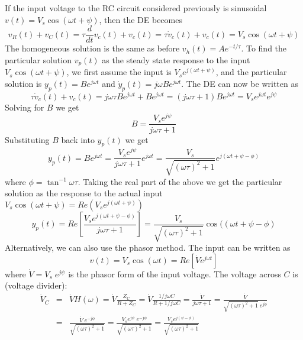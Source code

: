 \documentclass{article}
\begin{document}
If the input voltage to the RC circuit considered previously is sinusoidal 
$v(t)=V_s \cos(\omega t+\psi)$, then the DE becomes
\begin{equation}
  v_R(t)+v_C(t)=\tau\frac{d}{dt} v_c(t)+v_c(t)
  =\tau\dot{v}_c(t)+v_c(t)=V_s \cos(\omega t+\psi)	
\end{equation}
The homogeneous solution is the same as before $v_h(t)=A e^{-t/\tau}$.
To find the particular solution $v_p(t)$ as the steady state response 
to the input $V_s\cos(\omega t+\psi)$, we first assume the input is
$V_s e^{j(\omega t+\psi)}$, and the particular solution is $y_p(t)=B e^{j\omega t}$
and $\dot{y}_p(t)=j\omega B e^{j\omega t}$. The DE can now be written as
\begin{equation}
  \tau\dot{v}_c(t)+v_c(t)=j\omega\tau Be^{j\omega t}+Be^{j\omega t}
  =(j\omega\tau +1) B e^{j\omega t} =V_s e^{j\omega t} e^{j\psi}
\end{equation}
Solving for $B$ we get
\begin{equation}
  B=\frac{V_s e^{j\psi}}{j\omega\tau+1}
\end{equation}
Substituting $B$ back into $y_p(t)$ we get
\begin{equation}
  y_p(t)=B e^{j\omega t}=\frac{V_s e^{j\psi}}{j\omega\tau+1} e^{j\omega t}
  =\frac{V_s}{\sqrt{(\omega\tau)^2+1}}e^{j(\omega t+\psi-\phi)}
\end{equation}
where $\phi=\tan^{-1}\omega\tau$. Taking the real part of the above
we get the particular solution as the response to the actual input 
$V_s\cos(\omega t+\psi)=Re(V_s e^{j(\omega t+\psi)})$
\begin{equation}
  y_p(t)=Re\left[\frac{V_s e^{j(\omega t+\psi-\phi)}}{j\omega\tau+1}\right]
  =\frac{V_s}{\sqrt{(\omega\tau)^2+1}}\cos((\omega t+\psi-\phi)
\end{equation}
Alternatively, we can also use the phasor method. The input can be
written as
\begin{equation}
  v(t)=V_s \cos(\omega t)=Re[\dot{V} e^{j\omega t}]	
\end{equation}
where $\dot{V}=V_s\; e^{j\psi}$ is the phasor form of the input voltage.
The voltage across $C$ is (voltage divider):
\begin{eqnarray}
  \dot{V}_C&=&\dot{V} H(\omega)=\dot{V} \frac{Z_C}{R+Z_C}
  =\dot{V} \frac{1/j\omega C}{R+1/j\omega C}=\frac{\dot{V}}{j\omega \tau+1}	
  =\frac{\dot{V}}{\sqrt{(\omega \tau)^2+1}\;e^{j\phi}} 
  \nonumber \\
  &=&\frac{\dot{V}\;e^{-j\phi}}{\sqrt{(\omega \tau)^2+1}} 
  =\frac{V_se^{j\psi}\;e^{-j\phi}}{\sqrt{(\omega \tau)^2+1}} 
  =\frac{V_se^{j(\psi-\phi)}}{\sqrt{(\omega \tau)^2+1}} 
\end{eqnarray}
\end{document}
